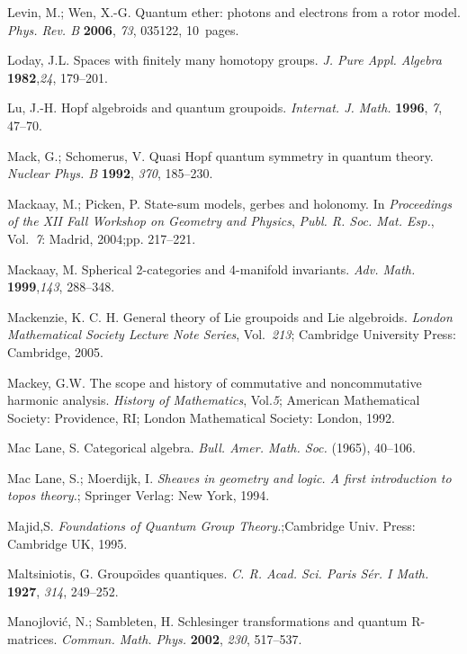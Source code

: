 \documentclass[12pt]{article}
\theoremstyle{plain}
\theoremstyle{definition}
\numberwithin{equation}{section}
\begin{document}
\begin{thebibliography}{99}
Levin, M.; Wen, X.-G. Quantum ether: photons and electrons from a rotor model. {\em Phys. Rev. B} {\bf 2006}, {\em 73}, 035122, 10~pages. %

Loday, J.L. Spaces with finitely many homotopy groups. {\em J. Pure Appl. Algebra} {\bf 1982},{\em 24}, 179--201.

Lu, J.-H. Hopf algebroids and quantum groupoids. {\em Internat. J. Math.} {\bf 1996}, {\em 7}, 47--70.

Mack, G.; Schomerus, V. Quasi Hopf quantum symmetry in quantum theory. {\em Nuclear Phys. B} {\bf 1992}, {\em 370}, 185--230.

Mackaay, M.; Picken, P. State-sum models, gerbes and holonomy. In {\em Proceedings of the XII Fall Workshop on Geometry and Physics}, {\em Publ. R. Soc. Mat. Esp.}, Vol.~{\em 7}: Madrid, 2004;pp. 217--221.

Mackaay, M. Spherical 2-categories and 4-manifold invariants. \emph{Adv. Math.} {\bf 1999},{\em 143}, 288--348.

Mackenzie, K. C. H. General theory of Lie groupoids and Lie algebroids. {\em London Mathematical Society Lecture Note Series}, Vol.~{\em 213}; Cambridge University Press: Cambridge, 2005.

Mackey, G.W. The scope and history of commutative and noncommutative harmonic analysis. {\em History of Mathematics}, Vol.{\em 5}; American Mathematical Society: Providence, RI; London Mathematical Society: London, 1992.

Mac Lane, S. Categorical algebra. \emph{Bull. Amer. Math. Soc.} (1965), 40--106.

Mac Lane, S.; Moerdijk, I. \emph{Sheaves in geometry and logic. A first introduction to topos theory.}; Springer Verlag: New York, 1994.

Majid,S. \emph{Foundations of Quantum Group Theory.};Cambridge Univ. Press: Cambridge UK, 1995.

Maltsiniotis, G. Groupo\"{\i}des quantiques. {\em C. R. Acad. Sci. Paris S\'er. I Math.} {\bf 1927}, {\em 314}, 249--252.

Manojlovi\'{c}, N.; Sambleten, H. Schlesinger transformations and quantum R-matrices. \emph{Commun. Math. Phys.} {\bf 2002}, {\em 230}, 517--537.


\end{thebibliography}
\end{document}
